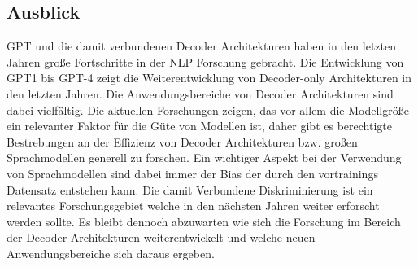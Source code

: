 \documentclass[conference]{IEEEtran}
\begin{document}
\subsection{Ausblick}
GPT und die damit verbundenen Decoder Architekturen haben in den letzten Jahren große Fortschritte in der NLP Forschung gebracht. Die Entwicklung von GPT1 bis GPT-4 zeigt die Weiterentwicklung von Decoder-only Architekturen in den letzten Jahren. Die Anwendungsbereiche von Decoder Architekturen sind dabei vielfältig. Die aktuellen Forschungen zeigen, das vor allem die Modellgröße ein relevanter Faktor für die Güte von Modellen ist, daher gibt es berechtigte Bestrebungen an der Effizienz von Decoder Architekturen bzw. großen Sprachmodellen generell zu forschen. Ein wichtiger Aspekt bei der Verwendung von Sprachmodellen sind dabei immer der Bias der durch den vortrainings Datensatz entstehen kann. Die damit Verbundene Diskriminierung ist ein relevantes Forschungsgebiet welche in den nächsten Jahren weiter erforscht werden sollte. Es bleibt dennoch abzuwarten wie sich die Forschung im Bereich der Decoder Architekturen weiterentwickelt und welche neuen Anwendungsbereiche sich daraus ergeben.





\end{document}
